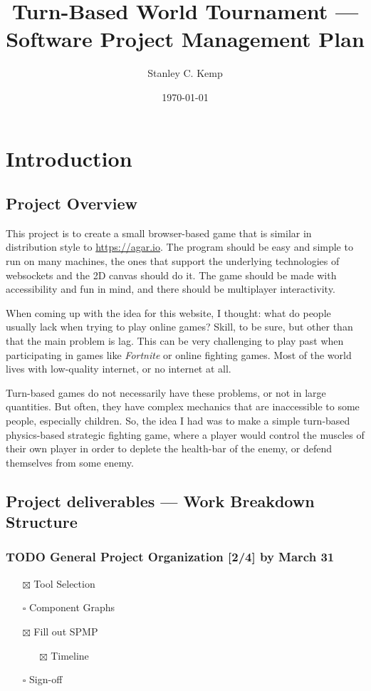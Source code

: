 \documentclass[11pt]{article}
\author{Stanley C. Kemp}
\date{\today}
\title{Turn-Based World Tournament --- Software Project Management Plan}
\begin{document}
\maketitle
\section{Introduction}
\label{sec:orgffe79fd}
\subsection{Project Overview}
\label{sec:org323e73c}
 This project is to create a small browser-based game that is similar in distribution style to \url{https://agar.io}.
The program should be easy and simple to run on many machines, the ones that support the underlying technologies 
of websockets and the 2D canvas should do it. The game should be made with accessibility and fun in mind, and there 
should be multiplayer interactivity.

When coming up with the idea for this website,
I thought: what do people usually lack when trying to play online games? Skill, to be sure, but other than that
the main problem is lag. This can be very challenging to play past when participating in games like \emph{Fortnite} or
online fighting games. Most of the world lives with low-quality internet, or no internet at all. 

Turn-based games do not necessarily have these problems, or not in large quantities. But often, they have complex
mechanics that are inaccessible to some people, especially children. So, the idea I had was to make 
a simple turn-based physics-based strategic fighting game, where a player would control the muscles of their own
player in order to deplete the health-bar of the enemy, or defend themselves from some enemy.
\subsection{Project deliverables --- Work Breakdown Structure}
\label{sec:org020017d}
\subsubsection{{\bfseries\sffamily TODO} General Project Organization [2/4] by March 31}
\label{sec:org5292f79}
\begin{itemize}
\item[{$\boxtimes$}] Tool Selection
\item[{$\square$}] Component Graphs
\item[{$\boxtimes$}] Fill out SPMP
\begin{itemize}
\item[{$\boxtimes$}] Timeline
\end{itemize}
\item[{$\square$}] Sign-off
\end{itemize}
\end{document}

